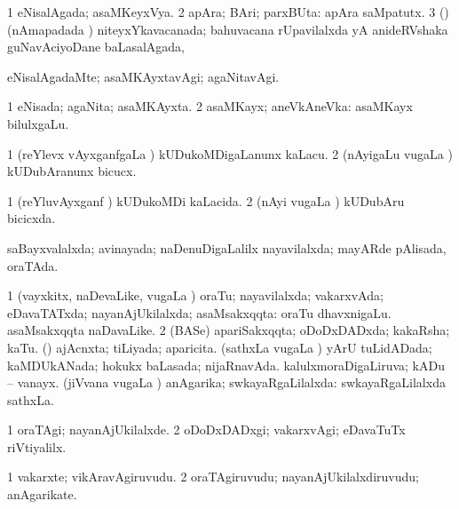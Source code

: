 \bentry
{} 
\gl{\gu}
\expl{}
\bmng
\bnum
\num{1} eNisalAgada; asaMKeyxVya. 
\num{2} apAra; BAri; parxBUta:  apAra saMpatutx. 
\num{3} (\vAyx) (nAmapadada \vi) niteyxYkavacanada; bahuvacana rUpavilalxda yA anideRVshaka guNavAciyoDane baLasalAgada, \udA\  
\enum
\emng
\eentry

\bentry
{} 
\gl{\kirxvi}
\expl{}
\bmng
 eNisalAgadaMte; asaMKAyxtavAgi; agaNitavAgi. 
\emng
\eentry

\bentry
{} 
\gl{\gu}
\expl{}
\bmng
\bnum
\num{1} eNisada; agaNita; asaMKAyxta. 
\num{2} asaMKayx; aneVkAneVka:  asaMKayx bilulxgaLu. 
\enum
\emng
\eentry

\bentry
{} 
\gl{\sakirx}
\expl{}
\bmng
\bnum
\num{1} (reYlevx vAyxganfgaLa \vi) kUDukoMDigaLanunx kaLacu. 
\num{2} (nAyigaLu \mo vugaLa \vi) kUDubAranunx bicucx. 
\enum
\emng
\eentry

\bentry
{} 
\gl{\gu}
\expl{}
\bmng
\bnum
\num{1} (reYluvAyxganf \vi) kUDukoMDi kaLacida. 
\num{2} (nAyi \mo vugaLa \vi) kUDubAru bicicxda. 
\enum
\emng
\eentry

\bentry
{} 
\gl{\gu}
\expl{}
\bmng
 saBayxvalalxda; avinayada; naDenuDigaLalilx nayavilalxda; mayARde pAlisada, oraTAda. 
\emng
\eentry

\bentry
{} 
\gl{\gu}
\bmng
\bnum
\num{1} (vayxkitx, naDevaLike, \mo vugaLa \vi) oraTu; nayavilalxda; vakarxvAda; eDavaTATxda; nayanAjUkilalxda; asaMsakxqqta:  oraTu dhavxnigaLu.  asaMsakxqqta naDavaLike. 
\num{2} (BASe) apariSakxqqta; oDoDxDADxda; kakaRsha; kaTu. 
 (\pArxparx) 
\banum
{} ajAcnxta; tiLiyada; aparicita. 
 (sathxLa \mo vugaLa \vi) yArU tuLidADada; kaMDUkANada; hokukx baLasada; nijaRnavAda. 
 kalulxmoraDigaLiruva; kADu -- vanayx. 
 (jiVvana \mo vugaLa \vi) anAgarika; swkayaRgaLilalxda:  swkayaRgaLilalxda sathxLa. 
\eanum
\numie
\enum
\emng
\eentry

\bentry
{} 
\gl{\kirxvi}
\bmng
\bnum
\num{1} oraTAgi; nayanAjUkilalxde. 
\num{2} oDoDxDADxgi; vakarxvAgi; eDavaTuTx riVtiyalilx. 
\enum
\emng
\eentry

\bentry
{} 
\gl{\nA}
\expl{}
\bmng
\bnum
\num{1} vakarxte; vikAravAgiruvudu. 
\num{2} oraTAgiruvudu; nayanAjUkilalxdiruvudu; anAgarikate. 
\enum
\emng
\eentry

